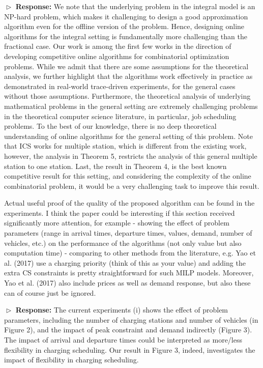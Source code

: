 \documentclass[11pt]{article}
\begin{document}
$\vartriangleright$ \noindent\textbf{Response:} We note that the underlying problem in the integral model is an NP-hard problem, which makes it challenging to design a good approximation algorithm even for the offline version of the problem. Hence, designing online algorithms for the integral setting is fundamentally more challenging than the fractional case. Our work is among the first few works in the direction of developing competitive online algorithms for combinatorial optimization problems. While we admit that there are some assumptions for the theoretical analysis, we further highlight that the algorithms work effectively in practice as demonstrated in real-world trace-driven experiments, for the general cases without those assumptions. Furthermore, the theoretical analysis of underlying mathematical problems in the general setting are extremely challenging problems in the theoretical computer science literature, in particular, job scheduling problems. To the best of our knowledge, there is no deep theoretical understanding of online algorithms for the general setting of this problem. Note that ICS works for multiple station, which is different from the existing work, however, the analysis in Theorem 5, restricts the analysis of this general multiple station to one station. Last, the result in Theorem 4, is the best known competitive result for this setting, and considering the complexity of the online combinatorial problem, it would be a very challenging task to improve this result. 

\vspace{3mm}
{\color{blue} Actual useful proof of the quality of the proposed algorithm can be found in the experiments. I think the paper could be interesting if this section received significantly more attention, for example
 - showing the effect of problem parameters (range in arrival times, departure times, values, demand, number of vehicles, etc.) on the performance of the  algorithms (not only value but also computation time)
 - comparing to other methods from the literature, e.g. Yao et al. (2017) use a charging priority (think of this as your value) and adding the extra CS constraints is pretty straightforward for such MILP models. Moreover, Yao et al. (2017) also include prices as well as demand response, but also these can of course just be ignored.
 }
\vspace{3mm}

$\vartriangleright$ \noindent\textbf{Response:} 
The current experiments (i) shows the effect of problem parameters, including the number of charging stations and number of vehicles (in Figure 2), and the impact of peak constraint and demand indirectly (Figure 3). The impact of arrival and departure times could be interpreted as more/less flexibility in charging scheduling. Our result in Figure 3, indeed, investigates the impact of flexibility in charging scheduling. 
\end{document}
